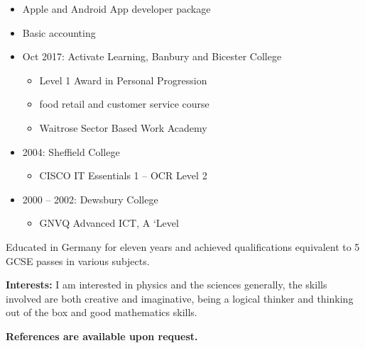 \documentclass[10pt,a4paper]{book}
\begin{document}
\begin{flushleft}
\begin{itemize}
\begin{itemize}
    \item Apple and Android App developer package

    \item Basic accounting
    \end{itemize}
    \end{itemize}
    \begin{itemize}
      \item Oct 2017: Activate Learning, Banbury and Bicester College
      \begin{itemize}
    \item Level 1 Award in Personal Progression

    \item food retail and customer service course

    \item Waitrose Sector Based Work Academy
    \end{itemize}
  \end{itemize}
  \begin{itemize}
  \item 2004: Sheffield College
\begin{itemize}
    \item CISCO IT Essentials 1 -- OCR Level 2
    \end{itemize}
  \end{itemize}
  \begin{itemize}
  \item 2000 -- 2002: Dewsbury College
    \begin{itemize}
    \item GNVQ Advanced ICT, A `Level
    \end{itemize}
    \end{itemize}
Educated in Germany for eleven years and achieved qualifications
equivalent to 5 GCSE passes in various subjects.
\linebreak{}

\textbf {Interests:}
I am interested in physics and the sciences generally, the skills involved are both creative and imaginative, being a logical thinker and thinking out of the box and good mathematics skills.
\linebreak{}

\textbf {References are available upon request.}
\end{flushleft}
\end{document}
